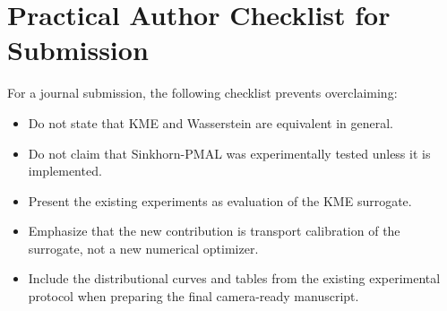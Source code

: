 \documentclass[10pt,journal]{IEEEtran}
\begin{document}
\section{Practical Author Checklist for Submission}
\label{app:checklist}

For a journal submission, the following checklist prevents overclaiming:
\begin{itemize}[leftmargin=1.1em]
    \item Do not state that KME and Wasserstein are equivalent in general.
    \item Do not claim that Sinkhorn-PMAL was experimentally tested unless it is implemented.
    \item Present the existing experiments as evaluation of the KME surrogate.
    \item Emphasize that the new contribution is transport calibration of the surrogate, not a new numerical optimizer.
    \item Include the distributional curves and tables from the existing experimental protocol when preparing the final camera-ready manuscript.
\end{itemize}

\fi
\end{document}

